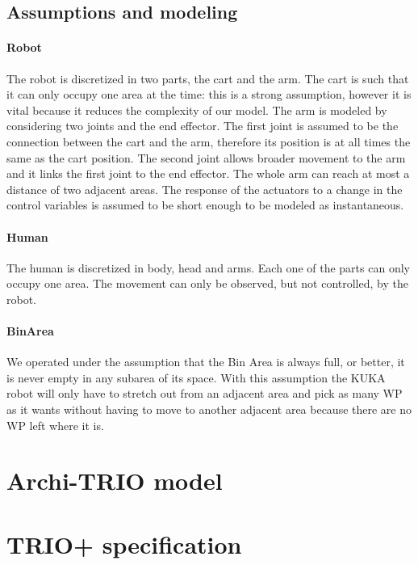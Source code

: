 \documentclass[a4paper]{article}
\begin{document}
\subsection{Assumptions and modeling}
\paragraph{Robot}
The robot is discretized in two parts, the cart and the arm. The cart is such that it can only occupy one area at the time: this is a strong assumption, however it is vital because it reduces the complexity of our model. The arm is modeled by considering two joints and the end effector. The first joint is assumed to be the connection between the cart and the arm, therefore its position is at all times the same as the cart position. The second joint allows broader movement to the arm and it links the first joint to the end effector. The whole arm can reach at most a distance of two adjacent areas. The response of the actuators to a change in the control variables is assumed to be short enough to be modeled as instantaneous.

\paragraph{Human}
The human is discretized in body, head and arms. Each one of the parts can only occupy one area. The movement can only be observed, but not controlled, by the robot.

\paragraph{BinArea}
We operated under the assumption that the Bin Area is always full, or better, it is never empty in any subarea of its space. With this assumption the KUKA robot will only have to stretch out from an adjacent area and pick as many WP as it wants without having to move to another adjacent area because there are no WP left where it is. 

\clearpage
\section{Archi-TRIO model}




\clearpage
\section{TRIO+ specification}
\end{document}
